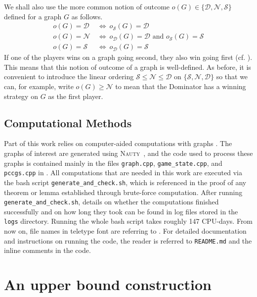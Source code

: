 \documentclass[a4paper,11pt,oneside]{scrartcl}
\theoremstyle{definition}
\theoremstyle{remark}
\newcommand{\nauty}{\textsc{Nauty}}
\begin{document}
We shall also use the more common notion of outcome $o(G) \in \{\mathcal D, \mathcal N, \mathcal S\}$ defined for a graph $G$ as follows. 
\begin{align*}
    o(G) = \mathcal D \ &\Leftrightarrow \ o_{\mathcal S}(G) = \mathcal D\\
    o(G) = \mathcal N \ &\Leftrightarrow \ o_{\mathcal D}(G) = \mathcal D \text{ and } o_{\mathcal S}(G) = \mathcal S\\
    o(G) = \mathcal S \ &\Leftrightarrow \ o_{\mathcal D}(G) = \mathcal S
\end{align*}
If one of the players wins on a graph going second, they also win going first (cf. \cite[Proposition 2.1.6]{HKSS}). This means that this notion of outcome of a graph is well-defined. As before, it is convenient to introduce the linear ordering $\mathcal S \leq \mathcal N \leq \mathcal D$ on $\{\mathcal S,\mathcal N, \mathcal D\}$ so that we can, for example, write $o(G) \geq \mathcal N$ to mean that the Dominator has a winning strategy on $G$ as the first player.

\subsection*{Computational Methods}
Part of this work relies on computer-aided computations with graphs \cite{repo}. 
The graphs of interest are generated using \nauty\ \cite{McKayPiperno2014}, and the code used to process these graphs is contained mainly in the files \texttt{graph.cpp}, \texttt{game\_state.cpp}, and \texttt{pccgs.cpp} in \cite{repo}. All computations that are needed in this work are executed via the bash script \texttt{generate\_and\_check.sh}, which is referenced in the proof of any theorem or lemma established through brute-force computation. After running \texttt{generate\_and\_check.sh}, details on whether the computations finished successfully and on how long they took can be found in log files stored in the \texttt{logs} directory. Running the whole bash script takes roughly 147 CPU-days.
From now on, file names in teletype font are  referring to \cite{repo}. For detailed documentation and instructions on running the code, the reader is referred to \texttt{README.md} and the inline comments in the code. 

\section{An upper bound construction}\label{sec:g-construction}
\end{document}
